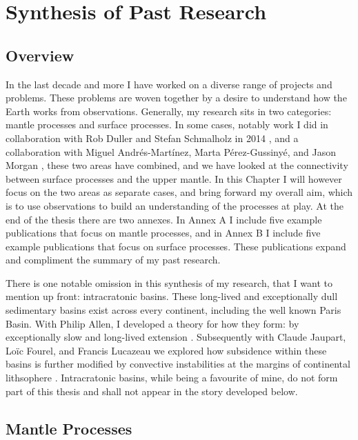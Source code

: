 \chapter{Synthesis of Past Research}\label{ch:synthesis-of-past-research}


\section{Overview}\label{sec:overview}

In the last decade and more I have worked on a diverse range of projects and problems. These problems are woven together by a desire to understand how the Earth works from observations. Generally, my research sits in two categories: mantle processes and surface processes. In some cases, notably work I did in collaboration with Rob Duller and Stefan Schmalholz in 2014 \citep{armitage-etal-2014}, and a collaboration with Miguel Andrés-Mart\'inez, Marta Pérez-Gussinyé, and Jason Morgan \citep{andres-martinez-etal-2019}, these two areas have combined, and we have looked at the connectivity between surface processes and the upper mantle. In this Chapter I will however focus on the two areas as separate cases, and bring forward my overall aim, which is to use observations to build an understanding of the processes at play. At the end of the thesis there are two annexes. In Annex A I include five example publications that focus on mantle processes, and in Annex B I include five example publications that focus on surface processes. These publications expand and compliment the summary of my past research.

There is one notable omission in this synthesis of my research, that I want to mention up front: intracratonic basins. These long-lived and exceptionally dull sedimentary basins exist across every continent, including the well known Paris Basin. With Philip Allen, I developed a theory for how they form: by exceptionally slow and long-lived extension \citep{armitage-2010,allen-2012}. Subsequently with Claude Jaupart, Loïc Fourel, and Francis Lucazeau we explored how subsidence within these basins is further modified by convective instabilities at the margins of continental lithsophere \citep{armitage-etal-jgr-2013,lucazeau-etal-2015}. Intracratonic basins, while being a favourite of mine, do not form part of this thesis and shall not appear in the story developed below.

\section{Mantle Processes}

